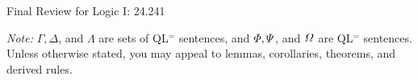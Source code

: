 \documentclass[12pt]{article}
\begin{document}
%
%
\newcommand{\detritus}[1]{}


\thispagestyle{empty}






\begin{center}
\large Final Review for Logic I: 24.241 \\[1ex] 
\end{center}

\noindent
\textit{Note:} $\Gamma,\Delta$, and $\Lambda$ are sets of QL$^=$ sentences, and $\varPhi,\varPsi$, and $\varOmega$ are QL$^=$ sentences.
Unless otherwise stated, you may appeal to lemmas, corollaries, theorems, and derived rules.\\
\end{document}
